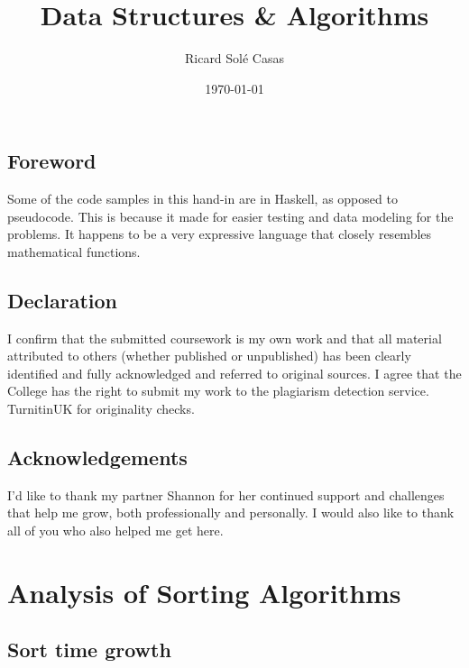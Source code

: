 \documentclass[english,a4paper,]{report}
\title{Data Structures \& Algorithms}
\author{Ricard Solé Casas}
\institute{Google UK \and Ada National College for Digital Skills}
\date{\today}
\begin{document}
\maketitle

\vspace*{\fill}

\section*{Foreword}

Some of the code samples in this hand-in are in Haskell, as opposed to
pseudocode. This is because it made for easier testing and data modeling
for the problems. It happens to be a very expressive language that
closely resembles mathematical functions.

\section*{Declaration}

I confirm that the submitted coursework is my own work and that all
material attributed to others (whether published or unpublished) has
been clearly identified and fully acknowledged and referred to original
sources. I agree that the College has the right to submit my work to the
plagiarism detection service. TurnitinUK for originality checks.

\section*{Acknowledgements}

I'd like to thank my partner Shannon for her continued support and
challenges that help me grow, both professionally and personally. I
would also like to thank all of you who also helped me get here.

\vspace*{\fill}

{
\setcounter{tocdepth}{2}
\tableofcontents
}
\chapter{Analysis of Sorting
Algorithms}\label{analysis-of-sorting-algorithms}

\section{Sort time growth}\label{sort-time-growth}

\sortdata
\end{document}
